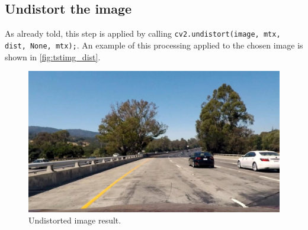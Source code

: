 \documentclass{article}
\let\cd\lstinline
\begin{document}
\subsection{Undistort the image}
As already told, this step is applied by calling \cd+cv2.undistort(image, mtx, dist, None, mtx);+. An example of this processing applied to the chosen image is shown in \autoref{fig:tstimg_dist}.
\begin{figure}
\centering
\includegraphics[scale=0.25]{output_images/test1/1_undistorted}
\caption{Undistorted image result.}
\label{fig:tstimg_dist}
\end{figure}
\end{document}

